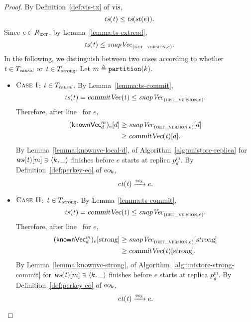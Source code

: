 \begin{proof} \label{proof:vis-perkey-eo}
  By Definition~\ref{def:vis-tx} of $\textsl{vis}$,
  \[
    \textsl{ts}(\mathit{t}) \le \textsl{ts}(\textsl{st}(e)).
  \]
  Since $e \in R_{\textsc{ext}}$, by Lemma~\ref{lemma:ts-extread},
  \[
    \textsl{ts}(\mathit{t}) \le \mathit{snapVec}_{(\textsc{get\_version}, e)}.
  \]
  In the following, we distinguish between two cases
  according to whether $\mathit{t} \in T_{\textsl{causal}}$
  or $\mathit{t} \in T_{\textsl{strong}}$.
  Let $m \triangleq \mathtt{partition}(k)$.
  \begin{itemize}
    \item $\textsc{Case I}$: $\mathit{t} \in T_{\textsl{causal}}$.
      By Lemma~\ref{lemma:ts-commit},
      \[
        \textsl{ts}(\mathit{t}) = \textsl{commitVec}(\mathit{t}) \le \mathit{snapVec}_{(\textsc{get\_version}, e)}.
      \]
      Therefore, after line~\code{\ref{alg:unistore-replica}}{\ref{line:readkey-wait-util-knownvc}}
      for $e$,
      \begin{align}
        ({\sf knownVec}^{m}_{d})_{e}[d]
        &\ge \mathit{snapVec}_{(\textsc{get\_version}, e)}[d] \notag \\
        &\ge \textsl{commitVec}(\mathit{t})[d].
        \label{eqn:vis-perkey-eo-knownvc-commitvc-causal}
      \end{align}
      By Lemma~\ref{lemma:knownvc-local-d},
      \commit{} of Algorithm~\ref{alg:unistore-replica}
      for $\textsl{ws}(\mathit{t})[m] \ni \langle k, \_ \rangle$
      finishes before $e$ starts at replica $p^{m}_{d}$.
      By Definition~\ref{def:perkey-eo} of $\textsl{eo}_{k}$,
      \[
        \textsl{ct}(\mathit{t}) \xrightarrow{\textsl{eo}_{k}} e.
      \]
    \item $\textsc{Case II}$: $\mathit{t} \in T_{\textsl{strong}}$.
      By Lemma~\ref{lemma:ts-commit},
      \[
        \textsl{ts}(\mathit{t}) = \textsl{commitVec}(\mathit{t}) \le \mathit{snapVec}_{(\textsc{get\_version}, e)}.
      \]
      Therefore, after line~\code{\ref{alg:unistore-replica}}{\ref{line:readkey-wait-util-knownvc}}
      for $e$,
      \begin{align}
        ({\sf knownVec}^{m}_{d})_{e}[\textsl{strong}]
        &\ge \mathit{snapVec}_{(\textsc{get\_version}, e)}[\textsl{strong}] \notag \\
        &\ge \textsl{commitVec}(\mathit{t})[\textsl{strong}].
        \label{eqn:vis-perkey-eo-knownvc-commitvc-strong}
      \end{align}
      By Lemma~\ref{lemma:knownvc-strong},
      \deliver{} of Algorithm~\ref{alg:unistore-strong-commit}
      for $\textsl{ws}(\mathit{t})[m] \ni \langle k, \_ \rangle$
      finishes before $e$ starts at replica $p^{m}_{d}$.
      By Definition~\ref{def:perkey-eo} of $\textsl{eo}_{k}$,
      \[
        \textsl{ct}(\mathit{t}) \xrightarrow{\textsl{eo}_{k}} e.
      \]
  \end{itemize}
\end{proof}
